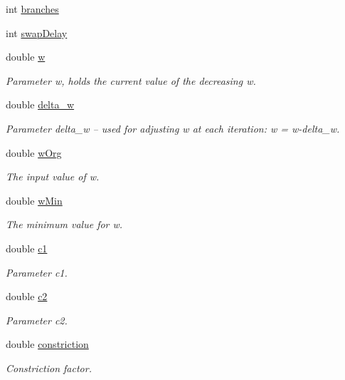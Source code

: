 \begin{CompactItemize}
int \hyperlink{classPSO_242f4b5836cf0c00d23ecdf63197fcce}{branches}
\item 
int \hyperlink{classPSO_2ff776549b60a99977bbe046db3475cf}{swapDelay}
\item 
double \hyperlink{classPSO_f4b142189309f79f9d7ef99930b5bebf}{w}
\begin{CompactList}\small\item\em Parameter w, holds the current value of the decreasing w. \item\end{CompactList}\item 
double \hyperlink{classPSO_87a3ee55a0e0cc8a84364d279ab1852b}{delta\_\-w}
\begin{CompactList}\small\item\em Parameter delta\_\-w -- used for adjusting w at each iteration: w = w-delta\_\-w. \item\end{CompactList}\item 
double \hyperlink{classPSO_a6b6a93e21e3011a966cb66264400327}{wOrg}
\begin{CompactList}\small\item\em The input value of w. \item\end{CompactList}\item 
double \hyperlink{classPSO_7c310fe0c71329a6bde8fba9928e99ab}{wMin}
\begin{CompactList}\small\item\em The minimum value for w. \item\end{CompactList}\item 
double \hyperlink{classPSO_6fd910b80d2ffb471ee644cf565e2d47}{c1}
\begin{CompactList}\small\item\em Parameter c1. \item\end{CompactList}\item 
double \hyperlink{classPSO_9c4540417d09f1b9cbb5779051842354}{c2}
\begin{CompactList}\small\item\em Parameter c2. \item\end{CompactList}\item 
double \hyperlink{classPSO_a7494b1abcbf4f8808237dbd089433de}{constriction}
\begin{CompactList}\small\item\em Constriction factor. \item\end{CompactList}\item 

\end{CompactItemize}
